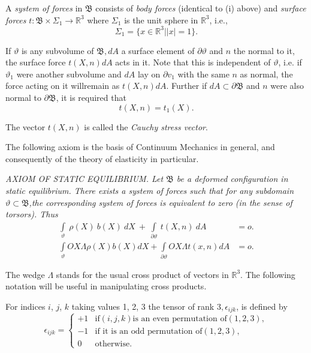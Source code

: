 A \textit{system of forces} in $\mathfrak{B}$ consists of \textit{body
  forces} (identical to (i) above) and \textit{surface forces} $t:
\mathfrak{B} \times \Sigma_1 \to \mathbb{R}^3$ where $\Sigma_1$ is the
unit sphere in $\mathbb{R}^3$, i.e.,  
$$
\Sigma_1 = \{x \in \mathbb{R}^3 || x | = 1 \}.
$$

If $\vartheta$ is any subvolume of $\mathfrak{B} , dA$ a surface
element of $\partial \vartheta$ and $n$ the normal to it, the surface
force $t (X, n) dA $ acts in it. Note that this is independent of
$\vartheta$, i.e. if $\vartheta_1$ were another subvolume and $dA$
lay on $\partial v_1$ with the same $n$ as normal, the force acting on
it  will\pageoriginale  remain as $t(X,n)dA$. Further if $dA \subset \partial
\mathfrak{B}$ and $n$ were also normal to $\partial \mathfrak{B}$, it
is required that 
\begin{equation*}
t(X,n) = t_1 (X).\tag{1.2-1}\label{eq1.2-1}
\end{equation*}

The vector $t(X,n)$ is called the \textit{Cauchy stress
  vector}. 

The following axiom is the basis of Continuum Mechanics in general,
and consequently of the theory of elasticity in particular. 

\medskip
\textit{AXIOM OF STATIC EQUILIBRIUM. Let $\mathfrak{B}$ be a deformed 
configuration in static equilibrium. There exists a system of forces
such that for any subdomain $\vartheta \subset \mathfrak{B}$,the
corresponding system of forces is equivalent to zero (in the sense of
torsors). Thus} 
\begin{align*}
  \int\limits_\vartheta ~\rho(X)~ b(X) ~dX~ +
  ~\int\limits_{\partial\vartheta}~ t(X,n)~ dA &= o.\tag{1.2-2}\label{eq1.2-2} \\
  \int\limits_{\vartheta} OX \Lambda \rho(X) b(X) dX +
  \int\limits_{\partial\vartheta} OX \Lambda t(x,n) dA & =
  o.\tag{1.2-3} \label{eq1.2-3} 
\end{align*}

The wedge $\Lambda$ stands for the usual cross product of vectors in
$\mathbb{R}^3$. The following notation will be useful in manipulating
cross products. 

For indices $i$, $j$, $k$ taking values 1, 2, 3 the tensor of rank
$3,\epsilon_{ijk}$, is defined by 
\begin{equation*}
  \epsilon_{ijk}=
  \begin{cases}
    +1 & \text{if} (i,j,k) \text{is an even permutation of} (1,2,3),\\
    -1 & \text{if it is an odd permutation of} (1,2,3),\\
    0 & \text{otherwise}.
  \end{cases}
  \tag{1.2-4}\label{eq1.2-4}
\end{equation*}

